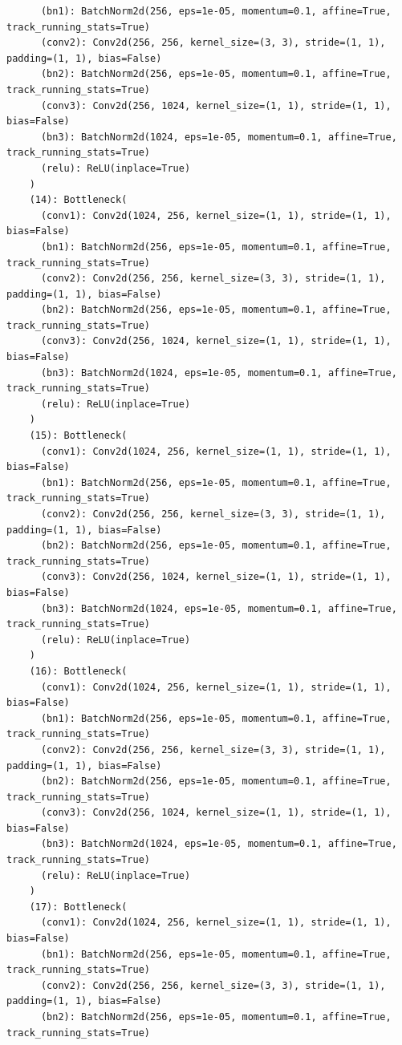 \documentclass{article}
\begin{document}
\begin{verbatim}
      (bn1): BatchNorm2d(256, eps=1e-05, momentum=0.1, affine=True, track_running_stats=True)
      (conv2): Conv2d(256, 256, kernel_size=(3, 3), stride=(1, 1), padding=(1, 1), bias=False)
      (bn2): BatchNorm2d(256, eps=1e-05, momentum=0.1, affine=True, track_running_stats=True)
      (conv3): Conv2d(256, 1024, kernel_size=(1, 1), stride=(1, 1), bias=False)
      (bn3): BatchNorm2d(1024, eps=1e-05, momentum=0.1, affine=True, track_running_stats=True)
      (relu): ReLU(inplace=True)
    )
    (14): Bottleneck(
      (conv1): Conv2d(1024, 256, kernel_size=(1, 1), stride=(1, 1), bias=False)
      (bn1): BatchNorm2d(256, eps=1e-05, momentum=0.1, affine=True, track_running_stats=True)
      (conv2): Conv2d(256, 256, kernel_size=(3, 3), stride=(1, 1), padding=(1, 1), bias=False)
      (bn2): BatchNorm2d(256, eps=1e-05, momentum=0.1, affine=True, track_running_stats=True)
      (conv3): Conv2d(256, 1024, kernel_size=(1, 1), stride=(1, 1), bias=False)
      (bn3): BatchNorm2d(1024, eps=1e-05, momentum=0.1, affine=True, track_running_stats=True)
      (relu): ReLU(inplace=True)
    )
    (15): Bottleneck(
      (conv1): Conv2d(1024, 256, kernel_size=(1, 1), stride=(1, 1), bias=False)
      (bn1): BatchNorm2d(256, eps=1e-05, momentum=0.1, affine=True, track_running_stats=True)
      (conv2): Conv2d(256, 256, kernel_size=(3, 3), stride=(1, 1), padding=(1, 1), bias=False)
      (bn2): BatchNorm2d(256, eps=1e-05, momentum=0.1, affine=True, track_running_stats=True)
      (conv3): Conv2d(256, 1024, kernel_size=(1, 1), stride=(1, 1), bias=False)
      (bn3): BatchNorm2d(1024, eps=1e-05, momentum=0.1, affine=True, track_running_stats=True)
      (relu): ReLU(inplace=True)
    )
    (16): Bottleneck(
      (conv1): Conv2d(1024, 256, kernel_size=(1, 1), stride=(1, 1), bias=False)
      (bn1): BatchNorm2d(256, eps=1e-05, momentum=0.1, affine=True, track_running_stats=True)
      (conv2): Conv2d(256, 256, kernel_size=(3, 3), stride=(1, 1), padding=(1, 1), bias=False)
      (bn2): BatchNorm2d(256, eps=1e-05, momentum=0.1, affine=True, track_running_stats=True)
      (conv3): Conv2d(256, 1024, kernel_size=(1, 1), stride=(1, 1), bias=False)
      (bn3): BatchNorm2d(1024, eps=1e-05, momentum=0.1, affine=True, track_running_stats=True)
      (relu): ReLU(inplace=True)
    )
    (17): Bottleneck(
      (conv1): Conv2d(1024, 256, kernel_size=(1, 1), stride=(1, 1), bias=False)
      (bn1): BatchNorm2d(256, eps=1e-05, momentum=0.1, affine=True, track_running_stats=True)
      (conv2): Conv2d(256, 256, kernel_size=(3, 3), stride=(1, 1), padding=(1, 1), bias=False)
      (bn2): BatchNorm2d(256, eps=1e-05, momentum=0.1, affine=True, track_running_stats=True)

\end{verbatim}
\end{document}
